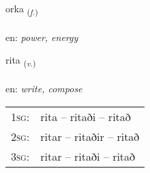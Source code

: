 \documentclass[frontgrid, backgrid]{flacards}\usepackage[]{graphicx}\usepackage[]{color}
\begin{document}
\renewcommand{\flhead}{\vskip5pt \fboxsep=0pt {\small\bfseries\footnotesize Nafnorð | Noun}}
\renewcommand{\fcfoot}{\vskip5pt \fboxsep=0pt \hspace{2pt}{\small\bfseries\footnotesize 2K}}

\renewcommand{\blhead}{\vskip5pt {\small\bfseries\footnotesize Nafnorð | Noun }}
\renewcommand{\bcfoot}{\vskip5pt \hspace{2pt}{\small\bfseries\footnotesize 2K}}


{orka \small{\textsubscript{(\textit{f.})}} \\[1ex] %
\textphonetic{[ɔr̥ka]} \\
en: \emph{power, energy} \\  [2ex]
\renewcommand*{\arraystretch}{0.8}
}

\renewcommand{\flhead}{\vskip5pt \fboxsep=0pt {\small\bfseries\footnotesize Sagnorð | Verb}}
\renewcommand{\fcfoot}{\vskip5pt \fboxsep=0pt \hspace{2pt}{\small\bfseries\footnotesize 2K}}

\renewcommand{\blhead}{\vskip5pt {\small\bfseries\footnotesize Sagnorð | Verb }}
\renewcommand{\bcfoot}{\vskip5pt \hspace{2pt}{\small\bfseries\footnotesize 2K}}


{rita \small{\textsubscript{(\textit{v.})}} \\[1ex] %
\textphonetic{[rɪːta]} \\
en: \emph{write, compose} \\  [2ex]
\renewcommand*{\arraystretch}{0.8}
\begin{tabular}{p{1cm}l}
\textsc{1sg}: & rita -- ritaði -- ritað \\ 
\textsc{2sg}: & ritar -- ritaðir -- ritað \\ 
\textsc{3sg}: & ritar -- ritaði -- ritað \\ 
\end{tabular}
}
\end{document}
